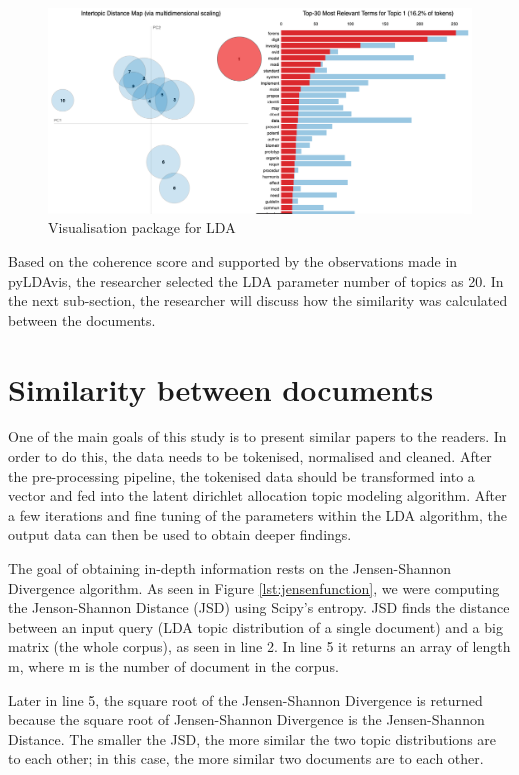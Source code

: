 \begin{figure}[htbp]
\centering
\includegraphics[width=\textwidth]{./figures/LDAVIS.png}
\caption{Visualisation package for LDA}
\label{fig:LDAVIS}
\end{figure}

Based on the coherence score and supported by the observations made in pyLDAvis, the researcher selected the LDA parameter number of topics as 20. In the next sub-section, the researcher will discuss how the similarity was calculated between the documents.

\section{Similarity between documents}

One of the main goals of this study is to present similar papers to the readers. In order to do this, the data needs to be tokenised, normalised and cleaned. After the pre-processing pipeline, the tokenised data should be transformed into a vector and fed into the latent dirichlet allocation topic modeling algorithm. After a few iterations and fine tuning of the parameters within the LDA algorithm, the output data can then be used to obtain deeper findings.

The goal of obtaining in-depth information rests on the Jensen-Shannon Divergence algorithm. As seen in Figure \ref{lst:jensenfunction}, we were computing the Jenson-Shannon Distance (JSD) using Scipy’s entropy. JSD finds the distance between an input query (LDA topic distribution of a single document) and a big matrix (the whole corpus), as seen in line 2. In line 5 it returns an array of length m, where m is the number of document in the corpus.

Later in line 5, the square root of the Jensen-Shannon Divergence is returned because the square root of Jensen-Shannon Divergence is the Jensen-Shannon Distance. The smaller the JSD, the more similar the two topic distributions are to each other; in this case, the more similar two documents are to each other.

